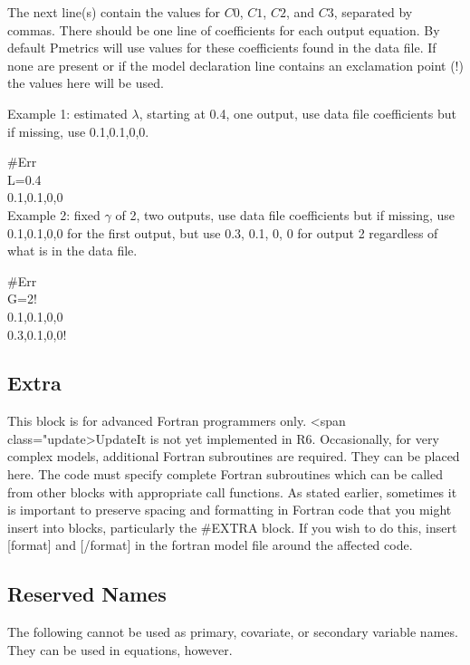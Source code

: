 \documentclass[
]{book}
\begin{document}
The next line(s) contain the values for \(C0\), \(C1\), \(C2\), and \(C3\),
separated by commas. There should be one line of coefficients for each
output equation. By default Pmetrics will use values for these
coefficients found in the data file. If none are present or if the model
declaration line contains an exclamation point (!) the values here will
be used.

Example 1: estimated \(\lambda\), starting at 0.4, one output, use data file
coefficients but if missing, use 0.1,0.1,0,0.

\#Err\\
L=0.4\\
0.1,0.1,0,0\\

Example 2: fixed \(\gamma\) of 2, two outputs, use data file coefficients but
if missing, use 0.1,0.1,0,0 for the first output, but use 0.3, 0.1, 0, 0
for output 2 regardless of what is in the data file.

\#Err\\
G=2!\\
0.1,0.1,0,0\\
0.3,0.1,0,0!\\

\hypertarget{extra}{%
\subsection{Extra}\label{extra}}

This block is for advanced Fortran programmers only.
\textless span class="update\textgreater UpdateIt is not yet implemented in R6.
Occasionally, for very complex models, additional Fortran subroutines are required. They can be placed here. The code must specify complete Fortran subroutines
which can be called from other blocks with appropriate call functions.
As stated earlier, sometimes it is important to preserve spacing and
formatting in Fortran code that you might insert into blocks,
particularly the \#EXTRA block. If you wish to do this, insert {[}format{]} and {[}/format{]} in the fortran model file around the affected code.

\hypertarget{reserved}{%
\subsection{Reserved Names}\label{reserved}}

The following cannot be used as primary, covariate, or secondary
variable names. They can be used in equations, however.
\end{document}
